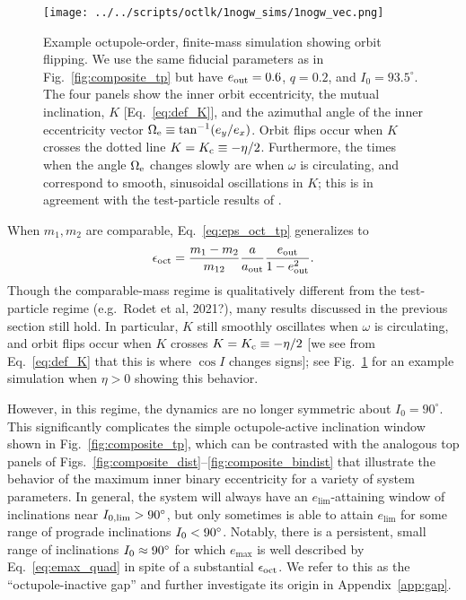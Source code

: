 \documentclass[
        fleqn,
        usenatbib,
    ]{mnras}
\newlength{\colummwidth}
\begin{document}
\begin{figure}
    \centering
    \texttt{[image: ../../scripts/octlk/1nogw\_sims/1nogw\_vec.png]}
    \caption{Example octupole-order, finite-mass simulation showing orbit
    flipping. We use the same fiducial parameters as in
    Fig.~\ref{fig:composite_tp} but have $e_{\rm out} = 0.6$, $q = 0.2$, and
    $I_0 = 93.5^\circ$. The four panels show the inner orbit eccentricity, the
    mutual inclination, $K$ [Eq.~\eqref{eq:def_K}], and the azimuthal angle of
    the inner eccentricity vector $\Omega_{\rm e} \equiv \tan^{-1}(e_y / e_x)$.
    Orbit flips occur when $K$ crosses the dotted line $K = K_{\rm c} \equiv
    -\eta / 2$. Furthermore, the times when the angle $\Omega_{\rm e}$ changes
    slowly are when $\omega$ is circulating, and correspond to smooth,
    sinusoidal oscillations in $K$; this is in agreement with the test-particle
    results of \citet{katz2011long}.
    }\label{fig:nogw_fiducial}
\end{figure}
When $m_1, m_2$ are comparable, Eq.~\eqref{eq:eps_oct_tp} generalizes to
\begin{equation}
    \epsilon_{\rm oct} = \frac{m_1 - m_2}{m_{12}} \frac{a}{a_{\rm out}}
        \frac{e_{\rm out}}{1 - e_{\rm out}^2}.\label{eq:eps_oct}
\end{equation}
Though the comparable-mass regime is qualitatively different from the
test-particle regime (e.g.\ Rodet et al, 2021?), many results discussed in the
previous section still hold. In particular, $K$ still smoothly oscillates when
$\omega$ is circulating, and orbit flips occur when $K$ crosses $K = K_{\rm c}
\equiv -\eta / 2$ [we see from Eq.~\eqref{eq:def_K} that this is where $\cos I$
changes signs]; see Fig.~\ref{fig:nogw_fiducial} for an example simulation when
$\eta > 0$ showing this behavior.

However, in this regime, the dynamics are no longer symmetric about $I_0 =
90^\circ$. This significantly complicates the simple octupole-active inclination
window shown in Fig.~\ref{fig:composite_tp}, which can be contrasted with the
analogous top panels of
Figs.~\ref{fig:composite_dist}--\ref{fig:composite_bindist} that illustrate the
behavior of the maximum inner binary eccentricity for a variety of system
parameters. In general, the system will always have an $e_{\lim}$-attaining
window of inclinations near $I_{\rm 0, \lim} > 90^\circ$, but only sometimes is
able to attain $e_{\lim}$ for some range of prograde inclinations $I_{\rm 0} <
90^\circ$. Notably, there is a persistent, small range of inclinations $I_{\rm
0} \approx 90^\circ$ for which $e_{\max}$ is well described by
Eq.~\eqref{eq:emax_quad} in spite of a substantial $\epsilon_{\rm oct}$. We
refer to this as the ``octupole-inactive gap'' and further investigate its
origin in Appendix~\ref{app:gap}.
\end{document}
